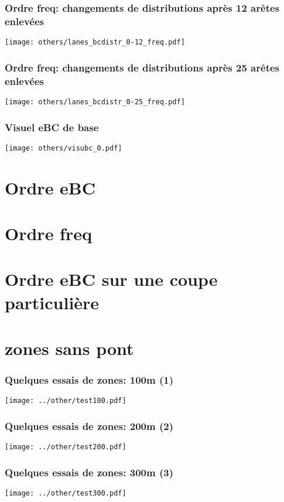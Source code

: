 \documentclass[aspectratio=169]{beamer}
\begin{document}
    \begin{frame}
        \frametitle{Ordre freq: changements de distributions après 12 arêtes enlevées}
        \centering
        \texttt{[image: others/lanes\_bcdistr\_0-12\_freq.pdf]}    
    \end{frame}

    \begin{frame}
        \frametitle{Ordre freq: changements de distributions après 25 arêtes enlevées}
        \centering
        \texttt{[image: others/lanes\_bcdistr\_0-25\_freq.pdf]}    
    \end{frame}

    \begin{frame}
        \frametitle{Visuel eBC de base}
        \centering
        \texttt{[image: others/visubc\_0.pdf]}
    \end{frame}

    \section{Ordre eBC}

    \section{Ordre freq}

    \section{Ordre eBC sur une coupe particulière}

    \section{zones sans pont}
    \begin{frame}
        \frametitle{Quelques essais de zones: 100m (1)}
        \texttt{[image: ../other/test100.pdf]}
    \end{frame}

    \begin{frame}
        \frametitle{Quelques essais de zones: 200m (2)}
        \texttt{[image: ../other/test200.pdf]}
    \end{frame}

    \begin{frame}
        \frametitle{Quelques essais de zones: 300m (3)}
        \texttt{[image: ../other/test300.pdf]}
    \end{frame}

    
\end{document}

